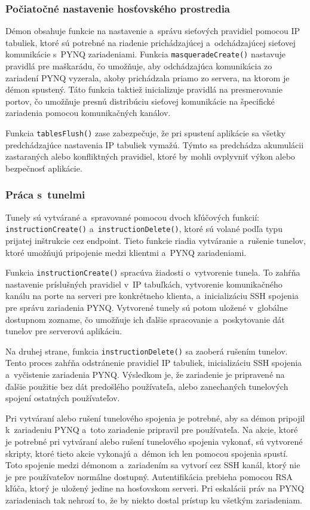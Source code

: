 \subsubsection*{Počiatočné nastavenie hosťovského prostredia}

Démon obsahuje funkcie na nastavenie a~správu sieťových pravidiel pomocou IP tabuliek, ktoré sú potrebné na riadenie prichádzajúcej a~odchádzajúcej sieťovej komunikácie s~PYNQ zariadeniami. Funkcia \verb|masqueradeCreate()| nastavuje pravidlá pre maškarádu, čo umožňuje, aby odchádzajúca komunikácia zo zariadení PYNQ vyzerala, akoby prichádzala priamo zo servera, na ktorom je démon spustený. Táto funkcia taktiež inicializuje pravidlá na presmerovanie portov, čo umožňuje presnú distribúciu sieťovej komunikácie na špecifické zariadenia pomocou komunikačných kanálov.

Funkcia \verb|tablesFlush()| zase zabezpečuje, že pri spustení aplikácie sa všetky predchádzajúce nastavenia IP tabuliek vymažú. Týmto sa predchádza akumulácii zastaraných alebo konfliktných pravidiel, ktoré by mohli ovplyvniť výkon alebo bezpečnosť aplikácie.

\subsubsection*{Práca s~tunelmi}

Tunely sú vytvárané a~spravované pomocou dvoch kľúčových funkcií: \verb|instructionCreate()| a~\verb|instructionDelete()|, ktoré sú volané podľa typu prijatej inštrukcie cez endpoint. Tieto funkcie riadia vytváranie a~rušenie tunelov, ktoré umožňujú pripojenie medzi klientmi a~PYNQ zariadeniami.

Funkcia \verb|instructionCreate()| spracúva žiadosti o~vytvorenie tunela. To zahŕňa nastavenie príslušných pravidiel v~IP tabuľkách, vytvorenie komunikačného kanálu na porte na serveri pre konkrétneho klienta, a~inicializáciu SSH spojenia pre správu zariadenia PYNQ. Vytvorené tunely sú potom uložené v~globálne dostupnom zozname, čo umožňuje ich ďalšie spracovanie a~poskytovanie dát tunelov pre serverovú aplikáciu.

Na druhej strane, funkcia \verb|instructionDelete()| sa zaoberá rušením tunelov. Tento proces zahŕňa odstránenie pravidiel IP tabuliek, inicializáciu SSH spojenia a~vyčistenie zariadenia PYNQ. Výsledkom je, že zariadenie je pripravené na ďalšie použitie bez dát predošlého používateľa, alebo zanechaných tunelových spojení ostatných používateľov.

Pri vytváraní alebo rušení tunelového spojenia je potrebné, aby sa démon pripojil k~zariadeniu PYNQ a~toto zariadenie pripravil pre používateľa. Na akcie, ktoré je potrebné pri vytváraní alebo rušení tunelového spojenia vykonať, sú vytvorené skripty, ktoré tieto akcie vykonajú a~démon ich len pomocou spojenia spustí. Toto spojenie medzi démonom a~zariadením sa vytvorí cez SSH kanál, ktorý nie je pre používateľov normálne dostupný. Autentifikácia prebieha pomocou RSA kľúča, ktorý je uložený jedine na hosťovskom serveri. Pri eskalácii práv na PYNQ zariadeniach tak nehrozí to, že by niekto dostal prístup ku všetkým zariadeniam.

